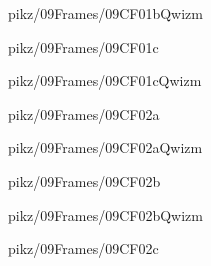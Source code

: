 \documentclass[9pt,xcolor={svgnames, x11names}]{beamer}
\begin{document}

\begin{frame}{pikz/09Frames/09CF01bQwizm}
	
\end{frame}


\begin{frame}{pikz/09Frames/09CF01c}
	
\end{frame}


\begin{frame}{pikz/09Frames/09CF01cQwizm}
	
\end{frame}


\begin{frame}{pikz/09Frames/09CF02a}
	
\end{frame}


\begin{frame}{pikz/09Frames/09CF02aQwizm}
	
\end{frame}


\begin{frame}{pikz/09Frames/09CF02b}
	
\end{frame}


\begin{frame}{pikz/09Frames/09CF02bQwizm}
	
\end{frame}


\begin{frame}{pikz/09Frames/09CF02c}
	
\end{frame}
\end{document}
